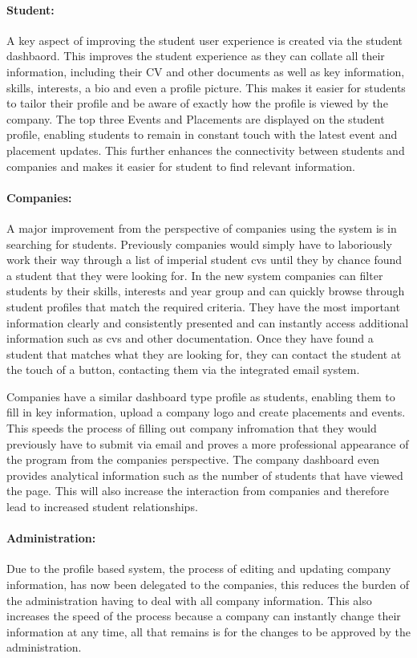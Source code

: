  \paragraph{Student:} 
 	A key aspect of improving the student user experience is created via the student dashbaord. This improves the student experience as they can collate all their information, including their CV and other documents as well as key information, skills, interests, a bio and even a profile picture. This makes it easier for students to tailor their profile and be aware of exactly how the profile is viewed by the company. The top three Events and Placements are displayed on the student profile, enabling students to remain in constant touch with the latest event and placement updates. This further enhances the connectivity between students and companies and makes it easier for student to find relevant information.

\paragraph{Companies:}
  A major improvement from the perspective of companies using the system is in searching for students. Previously companies would simply have to laboriously work their way through a list of imperial student cvs until they by chance found a student that they were looking for. In the new system companies can filter students by their skills, interests and year group and can quickly browse through student profiles that match the required criteria. They have the most important information clearly and consistently presented and can instantly access additional information such as cvs and other documentation. Once they have found a student that matches what they are looking for, they can contact the student at the touch of a button, contacting them via the integrated email system.

  Companies have a similar dashboard type profile as students, enabling them to fill in key information, upload a company logo and create placements and events. This speeds the process of filling out company infromation that they would previously have to submit via email and proves a more professional appearance of the program from the companies perspective. The company dashboard even provides analytical information such as the number of students that have viewed the page. This will also increase the interaction from companies and therefore lead to increased student relationships. 

\paragraph{Administration:}
  Due to the profile based system, the process of editing and updating company information, has now been delegated to the companies, this reduces the burden of the administration having to deal with all company information. This also increases the speed of the process because a company can instantly change their information at any time, all that remains is for the changes to be approved by the administration.

